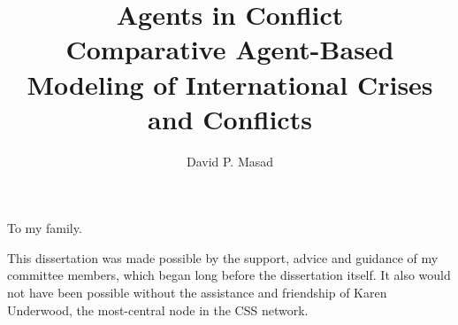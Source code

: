 \documentclass[11 pt]{report}
\begin{document}
\title{Agents in Conflict\\
            Comparative Agent-Based Modeling of International Crises and Conflicts}
\author{David P. Masad}













\signaturepage

\titlepage

\copyrightpage


\dedicationpage

\noindent To my family.


\acknowledgementspage

\noindent This dissertation was made possible by the support, advice and guidance of my committee members, which began long before the dissertation itself. It also would not have been possible without the assistance and friendship of Karen Underwood, the most-central node in the CSS network. 
\end{document}
